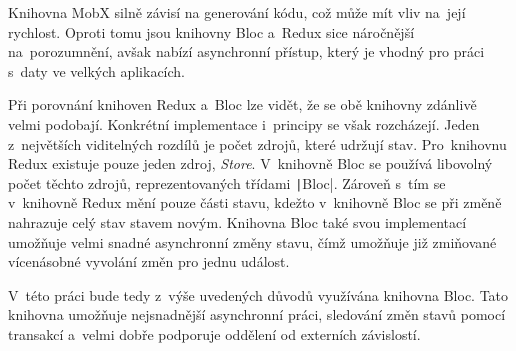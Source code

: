 Knihovna MobX silně závisí na generování kódu,
což může mít vliv na~její rychlost.
Oproti tomu jsou knihovny Bloc a~Redux sice náročnější na~porozumnění,
avšak nabízí asynchronní přístup,
který je vhodný pro práci s~daty ve velkých aplikacích.

Při porovnání knihoven Redux a~Bloc lze vidět,
že se obě knihovny zdánlivě velmi podobají.
Konkrétní implementace i~principy se však rozcházejí.
Jeden z~největších viditelných rozdílů je počet zdrojů,
které udržují stav.
Pro~\mbox{knihovnu} Redux existuje pouze jeden zdroj, \emph{Store}.
V~knihovně Bloc se používá libovolný počet těchto zdrojů,
reprezentovaných třídami \texttt|Bloc|.
\mbox{Zároveň} s~tím se v~knihovně Redux mění pouze části stavu,
kdežto v~knihovně Bloc se při změně nahrazuje celý stav stavem novým.
Knihovna Bloc také svou implementací umožňuje velmi snadné asynchronní
změny stavu,
čímž umožňuje již zmiňované vícenásobné vyvolání změn pro jednu událost.

V~této práci bude tedy z~výše uvedených důvodů využívána knihovna Bloc.
Tato knihovna umožňuje nejsnadnější asynchronní práci,
sledování změn stavů pomocí transakcí
a~velmi dobře podporuje oddělení od externích závislostí.
